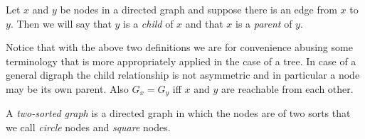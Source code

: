 \documentclass[oneside,12pt]{amsart}
\begin{document}
\begin{definition}
Let $x$ and $y$ be nodes in a directed graph and suppose there is an edge from
$x$ to $y$. Then we will say that $y$ is a \emph{child} of $x$ and that $x$ is a
\emph{parent} of $y$.
\end{definition}

Notice that with the above two definitions we are for convenience abusing some terminology that is
more appropriately applied in the case of a tree. In case of a general digraph the child
relationship is not asymmetric and in particular a node may be its own parent. Also
$G_x = G_y$ iff $x$ and $y$ are reachable from each other.

\begin{definition}
A \emph{two-sorted graph} is a directed graph in which the nodes are of two sorts
that we call \emph{circle} nodes and \emph{square} nodes.
\end{definition}
\end{document}
